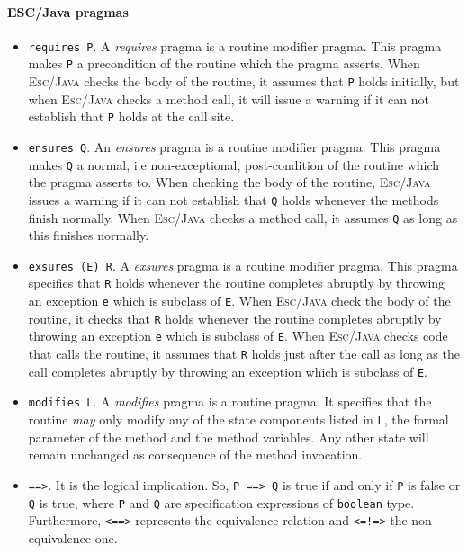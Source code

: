 \documentclass[a4paper]{llncs}
\begin{document}
\paragraph{\sc \bf ESC/Java pragmas}
\begin{itemize}

\item{\texttt{requires P}.} A \textit{requires} pragma is a routine
modifier pragma. This pragma makes \texttt{P} a precondition of the
routine which the pragma asserts. When \textsc{Esc/Java} checks the
body of the
routine, it assumes that \texttt{P} holds initially, but when
\textsc{Esc/Java} checks a method call, it will issue a warning if
it can not establish that \texttt{P} holds at the call site.

\item{\texttt{ensures Q}.} An \textit{ensures} pragma is a routine
modifier pragma. This pragma makes \texttt{Q} a normal, i.e
non-exceptional, post-condition of the routine which the pragma
asserts to. When checking the body of the routine, \textsc{Esc/Java}
issues a warning if it can not establish that \texttt{Q} holds
whenever the methods finish normally. When \textsc{Esc/Java} checks a
method call, it assumes \texttt{Q} as long as this finishes normally.

\item{\texttt{exsures (E) R}.} A \textit{exsures} pragma is a routine
modifier pragma. This pragma specifies that \texttt{R} holds whenever
the routine completes abruptly by throwing an exception \texttt{e}
which is subclass of \texttt{E}. When \textsc{Esc/Java} check the body 
of the routine, it checks that \texttt{R} holds whenever the routine
completes abruptly by throwing an exception \texttt{e} which is
subclass of \texttt{E}. When \textsc{Esc/Java} checks code that calls
the routine, it assumes that \texttt{R} holds just after the call as
long as the call completes abruptly by throwing an exception which is
subclass of \texttt{E}.

\item{\texttt{modifies L}.} A \textit{modifies} pragma is a routine
pragma. It specifies that the routine \emph{may} only modify any of
the state components listed in \texttt{L}, the formal parameter of
the method and the method variables. Any other state will remain
unchanged as consequence of the method invocation.
 
\item{\texttt{==>}.} It is the logical implication. So, \texttt{P
==> Q} is true if and only if \texttt{P} is false or \texttt{Q} is
true, where \texttt{P} and \texttt{Q} are specification expressions of 
\texttt{boolean} type. Furthermore, \texttt{<==>} represents the
equivalence relation and \texttt{<=!=>} the non-equivalence one.


\end{itemize}
\end{document}
